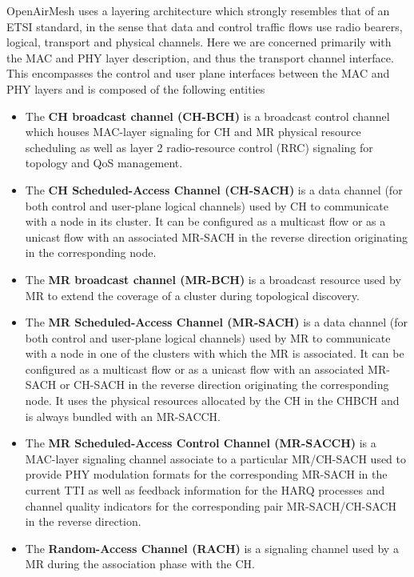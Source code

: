 \documentclass[a4paper,twocolumn,journal]{IEEEtran}
\begin{document}
OpenAirMesh uses a layering architecture which strongly resembles that of an ETSI standard, in the sense that data and control traffic flows use radio bearers, logical, transport and physical channels.  Here we are concerned primarily with the MAC and PHY layer description, and thus the transport channel interface. This encompasses the control and user plane interfaces between the MAC and PHY layers and is composed of the following entities
\begin{itemize}
\item The {\bf CH broadcast channel (CH-BCH)} is a broadcast control channel which houses MAC-layer signaling for CH and MR physical resource scheduling as well as layer 2 radio-resource control (RRC) signaling for topology and QoS management. 
\item The {\bf CH Scheduled-Access Channel (CH-SACH)} is a data channel (for both control and user-plane logical channels) used by CH to communicate with a node in its cluster.  It can be configured as a multicast flow or as a unicast flow with an associated MR-SACH in the reverse direction originating in the corresponding node.
\item The {\bf MR broadcast channel (MR-BCH)} is a broadcast resource used by MR to extend the coverage of a cluster during topological discovery. 
\item The {\bf MR Scheduled-Access Channel (MR-SACH)} is a data channel (for both control and user-plane logical channels) used by MR to communicate with a node in one of the clusters with which the MR is associated.  It can be configured as a multicast flow or as a unicast flow with an associated MR-SACH or CH-SACH in the reverse direction originating the corresponding node.  It uses the physical resources allocated by the CH in the CHBCH and is always bundled with an MR-SACCH. 
\item The {\bf MR Scheduled-Access Control Channel (MR-SACCH)} is a MAC-layer signaling channel associate to a particular MR/CH-SACH used to provide PHY modulation formats for the corresponding MR-SACH in the current TTI as well as feedback information for the HARQ processes and channel quality indicators for the corresponding pair MR-SACH/CH-SACH in the reverse direction. 
\item The {\bf Random-Access Channel (RACH)} is a signaling channel used by a MR during the association phase with the CH. 
\end{itemize}
\end{document}
